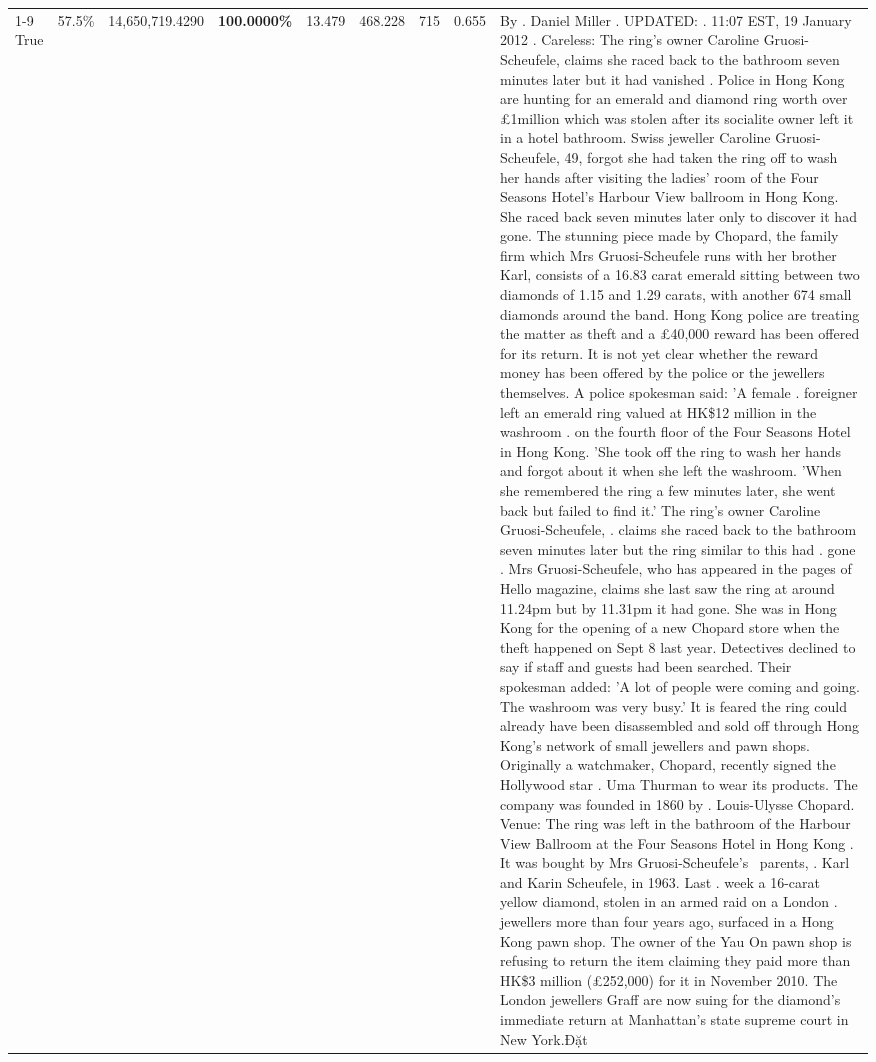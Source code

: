 \begin{table}[H]
\begin{tabular}{lllrlllll}
\cline{1-9}
True & 57.5\% & 14,650,719.4290 & \bfseries \color{red} 100.0000\% & 13.479 & 468.228 & 715 & 0.655 & By . Daniel Miller . UPDATED: . 11:07 EST, 19 January 2012 . Careless: The ring's owner Caroline Gruosi-Scheufele, claims she raced back to the bathroom seven minutes later but it had vanished . Police in Hong Kong are hunting for an emerald and diamond ring worth over £1million which was stolen after its socialite owner left it in a hotel bathroom. Swiss jeweller Caroline Gruosi-Scheufele, 49, forgot she had taken the ring off to wash her hands after visiting the ladies' room of the Four Seasons Hotel's Harbour View ballroom in Hong Kong. She raced back seven minutes later only to discover it had gone. The stunning piece made by Chopard, the family firm which Mrs Gruosi-Scheufele runs with her brother Karl, consists of a 16.83 carat emerald sitting between two diamonds of 1.15 and 1.29 carats, with another 674 small diamonds around the band. Hong Kong police are treating the matter as theft and a £40,000 reward has been offered for its return. It is not yet clear whether the reward money has been offered by the police or the jewellers themselves. A police spokesman said: 'A female . foreigner left an emerald ring valued at HK\$12 million in the washroom . on the fourth floor of the Four Seasons Hotel in Hong Kong. 'She took off the ring to wash her hands and forgot about it when she left the washroom. 'When she remembered the ring a few minutes later, she went back but failed to find it.' The ring's owner Caroline Gruosi-Scheufele, . claims she raced back to the bathroom seven minutes later but the ring similar to this had . gone . Mrs Gruosi-Scheufele, who has appeared in the pages of Hello magazine, claims she last saw the ring at around 11.24pm but by 11.31pm it had gone. She was in Hong Kong for the opening of a new Chopard store when the theft happened on Sept 8 last year. Detectives declined to say if staff and guests had been searched. Their spokesman added: 'A lot of people were coming and going. The washroom was very busy.' It is feared the ring could already have been disassembled and sold off through Hong Kong's network of small jewellers and pawn shops. Originally a watchmaker, Chopard, recently signed the Hollywood star . Uma Thurman to wear its products. The company was founded in 1860 by . Louis-Ulysse Chopard. Venue: The ring was left in the bathroom of the Harbour View Ballroom at the Four Seasons Hotel in Hong Kong . It was bought by Mrs Gruosi-Scheufele's  parents, . Karl and Karin Scheufele, in 1963. Last . week a 16-carat yellow diamond, stolen in an armed raid on a London . jewellers more than four years ago, surfaced in a Hong Kong pawn shop. The owner of the Yau On pawn shop is refusing to return the item claiming they paid more than HK\$3 million (£252,000) for it in November 2010. The London jewellers Graff are now suing for the diamond’s immediate return at Manhattan’s state supreme court in New York.Đặt \\

\end{tabular}
\end{table}
